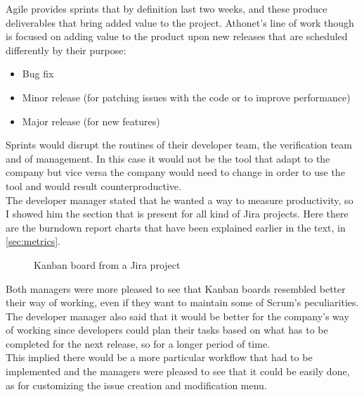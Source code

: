 	Agile provides sprints that by definition last two weeks, and these produce deliverables that bring added value to the project.
	Athonet's line of work though is focused on adding value to the product upon new releases that are scheduled differently by their purpose:
	\begin{itemize}
		\item Bug fix
		\item Minor release (for patching issues with the code or to improve performance)
		\item Major release (for new features)
	\end{itemize}
	Sprints would disrupt the routines of their developer team, the verification team and of management.
	In this case it would not be the tool that adapt to the company but vice versa the company would need to change in order to use the tool and would result counterproductive.\\
	The developer manager stated that he wanted a way to measure productivity, so I showed him the  section that is present for all kind of Jira projects.
	Here there are the burndown report charts that have been explained earlier in the text, in \ref{sec:metrics}.
	\begin{figure}[H]
		\centering
		\caption{Kanban board from a Jira project}
	\end{figure}
	Both managers were more pleased to see that Kanban boards resembled better their way of working, even if they want to maintain some of Scrum's peculiarities.
	The developer manager also said that it would be better for the company's way of working since developers could plan their tasks based on what has to be completed for the next release, so for a longer period of time.\\	
	This implied there would be a more particular workflow that had to be implemented and the managers were pleased to see that it could be easily done, as for customizing the issue creation and modification menu.\\

